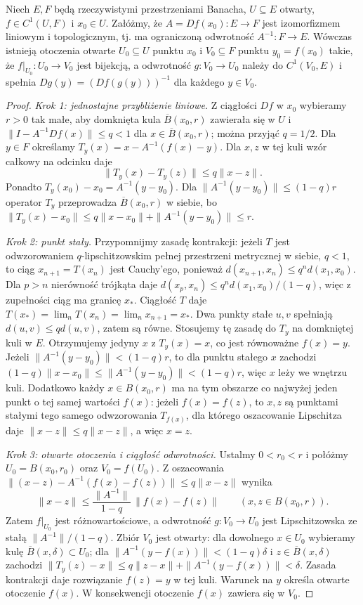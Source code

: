 \begin{twierdzenie}
\label{thm:inverse15}
Niech $E,F$ będą rzeczywistymi przestrzeniami Banacha, $U\subseteq E$ otwarty, $f\in C^1(U,F)$ i $x_0\in U$. Załóżmy, że $A=Df(x_0):E\to F$ jest izomorfizmem liniowym i topologicznym, tj. ma ograniczoną odwrotność $A^{-1}:F\to E$. Wówczas istnieją otoczenia otwarte $U_0\subseteq U$ punktu $x_0$ i $V_0\subseteq F$ punktu $y_0=f(x_0)$ takie, że $f|_{U_0}:U_0\to V_0$ jest bijekcją, a odwrotność $g:V_0\to U_0$ należy do $C^1(V_0,E)$ i spełnia
$Dg(y)=(Df(g(y)))^{-1}$ dla każdego $y\in V_0$.
\end{twierdzenie}
\begin{proof}
\emph{Krok 1: jednostajne przybliżenie liniowe.} Z ciągłości $Df$ w $x_0$ wybieramy $r>0$ tak małe, aby domknięta kula $\overline B(x_0,r)$ zawierała się w $U$ i
$\|I-A^{-1}Df(x)\|\le q<1$ dla $x\in\overline B(x_0,r)$; można przyjąć $q=1/2$. Dla $y\in F$ określamy $T_y(x)=x-A^{-1}(f(x)-y)$. Dla $x,z$ w tej kuli wzór całkowy na odcinku daje
\[
\|T_y(x)-T_y(z)\|\le q\|x-z\|.
\]
Ponadto $T_y(x_0)-x_0=A^{-1}(y-y_0)$. Dla $\|A^{-1}(y-y_0)\|\le(1-q)r$ operator $T_y$ przeprowadza $\overline B(x_0,r)$ w siebie, bo
$\|T_y(x)-x_0\|\le q\|x-x_0\|+\|A^{-1}(y-y_0)\|\le r$.

\emph{Krok 2: punkt stały.} Przypomnijmy zasadę kontrakcji: jeżeli $T$ jest odwzorowaniem $q$-lipschitzowskim pełnej przestrzeni metrycznej w siebie, $q<1$, to ciąg $x_{n+1}=T(x_n)$ jest Cauchy'ego, ponieważ $d(x_{n+1},x_n)\le q^n d(x_1,x_0)$. Dla $p>n$ nierówność trójkąta daje $d(x_p,x_n)\le q^n d(x_1,x_0)/(1-q)$, więc z zupełności ciąg ma granicę $x_*$. Ciągłość $T$ daje $T(x_*)=\lim_n T(x_n)=\lim_n x_{n+1}=x_*$. Dwa punkty stałe $u,v$ spełniają $d(u,v)\le qd(u,v)$, zatem są równe. Stosujemy tę zasadę do $T_y$ na domkniętej kuli w $E$. Otrzymujemy jedyny $x$ z $T_y(x)=x$, co jest równoważne $f(x)=y$. Jeżeli $\|A^{-1}(y-y_0)\|<(1-q)r$, to dla punktu stałego $x$ zachodzi $(1-q)\|x-x_0\|\le\|A^{-1}(y-y_0)\|<(1-q)r$, więc $x$ leży we wnętrzu kuli. Dodatkowo każdy $x\in B(x_0,r)$ ma na tym obszarze co najwyżej jeden punkt o tej samej wartości $f(x)$: jeżeli $f(x)=f(z)$, to $x,z$ są punktami stałymi tego samego odwzorowania $T_{f(x)}$, dla którego oszacowanie Lipschitza daje $\|x-z\|\le q\|x-z\|$, a więc $x=z$.

\emph{Krok 3: otwarte otoczenia i ciągłość odwrotności.} Ustalmy $0<r_0<r$ i połóżmy $U_0=B(x_0,r_0)$ oraz $V_0=f(U_0)$. Z oszacowania
$\|(x-z)-A^{-1}(f(x)-f(z))\|\le q\|x-z\|$ wynika
\[
\|x-z\|\le\frac{\|A^{-1}\|}{1-q}\,\|f(x)-f(z)\| \qquad(x,z\in B(x_0,r)).
\]
Zatem $f|_{U_0}$ jest różnowartościowe, a odwrotność $g:V_0\to U_0$ jest Lipschitzowska ze stałą $\|A^{-1}\|/(1-q)$. Zbiór $V_0$ jest otwarty: dla dowolnego $x\in U_0$ wybieramy kulę $\overline B(x,\delta)\subset U_0$; dla $\|A^{-1}(y-f(x))\|<(1-q)\delta$ i $z\in\overline B(x,\delta)$ zachodzi $\|T_y(z)-x\|\le q\|z-x\|+\|A^{-1}(y-f(x))\|<\delta$. Zasada kontrakcji daje rozwiązanie $f(z)=y$ w tej kuli. Warunek na $y$ określa otwarte otoczenie $f(x)$. W konsekwencji otoczenie $f(x)$ zawiera się w $V_0$.


\end{proof}
